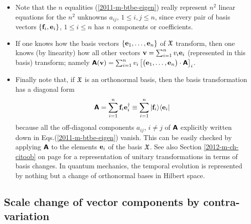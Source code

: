 \begin{itemize}
\item
Note   that the $n$ equalities (\ref {2011-m-btbe-eigen})
really represent $n^2$ linear equations for the $n^2$
unknowns $a_{ij}$, $1\le i,j\le n$, since every pair of basis vectors
$\{{\bf f}_i,{\bf e}_i\}$, $1\le i\le n$ has $n$ components or coefficients.

\item
If one knows how the basis vectors
$
\{
{\bf e}_1,
\ldots ,
{\bf e}_n
\}$ of ${\frak X}$    transform, then one knows (by linearity) how
all other vectors
${\bf v}=
\sum_{i=1}^n v_i{\bf e}_i
$
(represented in this basis) transform; namely
$\textsf{\textbf{A}}({\bf v})=
\sum_{i=1}^n v_i \left[\begin{pmatrix}{\bf e}_1,\ldots ,{\bf e}_n\end{pmatrix} \cdot \textsf{\textbf{A}}\right]_i
$.

\item
Finally note that, if  ${\frak X}$ is an orthonormal basis,
then the basis transformation has a diagonal form
\begin{equation}
\textsf{\textbf{A}} =   \sum_{i=1}^n  {\bf f}_i {\bf e}_i^\dagger
\equiv
\sum_{i=1}^n \vert {\bf f}_i \rangle \langle {\bf e}_i \vert
\label{2013-m-ch-fdvs-dftm}
\end{equation}
because all the off-diagonal components $a_{ij}$, $i\neq j$ of $\textsf{\textbf{A}}$
explicitly written down in Eqs.(\ref{2011-m-btbe-eigen}) vanish.
This can be easily checked by applying $\textsf{\textbf{A}}$ to the elements ${\bf e}_i $ of the basis ${\frak X}$.
See also Section
\ref{2012-m-ch-citoob} on page \pageref{2012-m-ch-citoob}
for a representation of unitary transformations in terms of basis changes.
In quantum mechanics, the temporal evolution is represented by nothing but a change of orthonormal bases in Hilbert space.
\end{itemize}


\subsection{Scale change of vector components by contra-variation}



